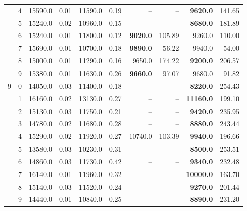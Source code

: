 {\begin{table}[htb!]
\begin{tabular}{cc|rr|rr|rr|rr}
 & 4 & 15590.0 & 0.01 & 11590.0 & 0.19 & -- & -- & \textbf{9620.0} & 141.65 \\
 & 5 & 15240.0 & 0.02 & 10960.0 & 0.15 & -- & -- & \textbf{8680.0} & 181.89 \\
 & 6 & 15240.0 & 0.01 & 11800.0 & 0.12 & \textbf{9020.0} & 105.89 & 9260.0 & 110.00 \\
 & 7 & 15690.0 & 0.01 & 10700.0 & 0.18 & \textbf{9890.0} & 56.22 & 9940.0 & 54.00 \\
 & 8 & 15000.0 & 0.01 & 11290.0 & 0.16 & 9650.0 & 174.22 & \textbf{9200.0} & 206.57 \\
 & 9 & 15380.0 & 0.01 & 11630.0 & 0.26 & \textbf{9660.0} & 97.07 & 9680.0 & 91.82 \\ \hline
9 & 0 & 14050.0 & 0.03 & 11400.0 & 0.18 & -- & -- & \textbf{8220.0} & 254.43 \\
 & 1 & 16160.0 & 0.02 & 13130.0 & 0.27 & -- & -- & \textbf{11160.0} & 199.10 \\
 & 2 & 15130.0 & 0.03 & 11750.0 & 0.21 & -- & -- & \textbf{9420.0} & 235.95 \\
 & 3 & 14780.0 & 0.02 & 11680.0 & 0.28 & -- & -- & \textbf{8880.0} & 243.44 \\
 & 4 & 15290.0 & 0.02 & 11920.0 & 0.27 & 10740.0 & 103.39 & \textbf{9940.0} & 196.66 \\
 & 5 & 13580.0 & 0.03 & 10230.0 & 0.31 & -- & -- & \textbf{8500.0} & 253.51 \\
 & 6 & 14860.0 & 0.03 & 11730.0 & 0.42 & -- & -- & \textbf{9340.0} & 232.48 \\
 & 7 & 16140.0 & 0.01 & 11960.0 & 0.32 & -- & -- & \textbf{10000.0} & 163.70 \\
 & 8 & 15140.0 & 0.03 & 11520.0 & 0.24 & -- & -- & \textbf{9270.0} & 201.44 \\
 & 9 & 14440.0 & 0.01 & 10840.0 & 0.25 & -- & -- & \textbf{8890.0} & 231.20 \\
\bottomrule
\end{tabular}
\end{table}
}
